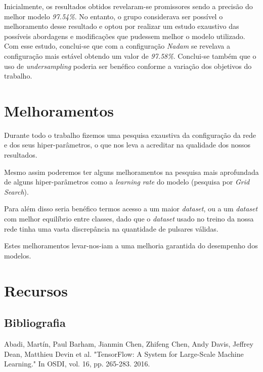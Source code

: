 \documentclass[]{article}
\begin{document}
    Inicialmente, os resultados obtidos revelaram-se promissores sendo a precisão do melhor modelo \textit{97.54\%}. No entanto, o grupo considerava ser possível o melhoramento desse resultado e optou por realizar um estudo exaustivo das possíveis abordagens e modificações que pudessem melhor o modelo utilizado. Com esse estudo, conclui-se que com a configuração \textit{Nadam} se revelava a configuração mais estável obtendo um valor de \textit{97.58\%}. Conclui-se também que o uso de \textit{undersampling} poderia ser benéfico conforme a variação dos objetivos do trabalho. 

\section{Melhoramentos}
\label{sec:melhoramentos}
	Durante todo o trabalho fizemos uma pesquisa exaustiva da configuração da rede e dos seus hiper-parâmetros, o que nos leva a acreditar na qualidade dos nossos resultados.
    
    Mesmo assim poderemos ter alguns melhoramentos na pesquisa mais aprofundada de alguns hiper-parâmetros como a \textit{learning rate} do modelo (pesquisa por \textit{Grid Search}).
    
    Para além disso seria benéfico termos acesso a um maior \textit{dataset}, ou a um \textit{dataset} com melhor equilíbrio entre classes, dado que o \textit{dataset} usado no treino da nossa rede tinha uma vasta discrepância na quantidade de pulsares válidas.
    
    Estes melhoramentos levar-nos-iam a uma melhoria garantida do desempenho dos modelos.
    
\newpage


\section{Recursos}
\subsection{Bibliografia}

Abadi, Martín, Paul Barham, Jianmin Chen, Zhifeng Chen, Andy Davis, Jeffrey Dean, Matthieu Devin et al. "TensorFlow: A System for Large-Scale Machine Learning." In OSDI, vol. 16, pp. 265-283. 2016.
\\
\end{document}
